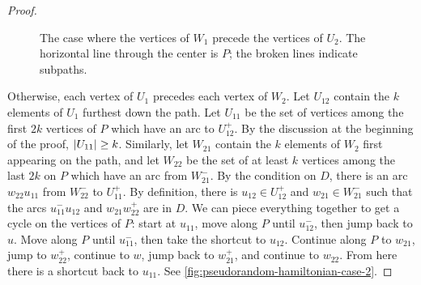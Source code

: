 \documentclass[11pt,english]{article}
\theoremstyle{plain}
\theoremstyle{definition}
\theoremstyle{definition}
\theoremstyle{plain}
\theoremstyle{plain}
\theoremstyle{plain}
\theoremstyle{plain}
\theoremstyle{remark}
\theoremstyle{remark}
\let\originalleft\left
\let\originalright\right
\renewcommand{\left}{\mathopen{}\mathclose\bgroup\originalleft}
\renewcommand{\right}{\aftergroup\egroup\originalright}
\begin{document}
\begin{proof}
\begin{figure}[H]
\begin{center}
\hspace{0.5cm}
\hspace{0.5cm}
\end{center}

\protect\caption{\label{fig:pseudorandom-hamiltonian-case-1}The case where the vertices
of $W_{1}$ precede the vertices of $U_{2}$. The horizontal line
through the center is $P$; the broken lines indicate subpaths.}
\end{figure}


Otherwise, each vertex of $U_{1}$ precedes each vertex of $W_{2}$.
Let $U_{12}$ contain the $k$ elements of $U_{1}$ furthest down
the path. Let $U_{11}$ be the set of vertices among the first $2k$
vertices of $P$ which have an arc to $U_{12}^{+}$. By the discussion
at the beginning of the proof, $\left|U_{11}\right|\ge k$. Similarly,
let $W_{21}$ contain the $k$ elements of $W_{2}$ first appearing
on the path, and let $W_{22}$ be the set of at least $k$ vertices
among the last $2k$ on $P$ which have an arc from $W_{21}^{-}$.
By the condition on $D$, there is an arc $w_{22}u_{11}$ from $W_{22}^{-}$
to $U_{11}^{+}$. By definition, there is $u_{12}\in U_{12}^{+}$
and $w_{21}\in W_{21}^{-}$ such that the arcs $u_{11}^{-}u_{12}$
and $w_{21}w_{22}^{+}$ are in $D$. We can piece everything together
to get a cycle on the vertices of $P$: start at $u_{11}$, move along
$P$ until $u_{12}^{-}$, then jump back to $u$. Move along $P$
until $u_{11}^{-}$, then take the shortcut to $u_{12}$. Continue
along $P$ to $w_{21}$, jump to $w_{22}^{+}$, continue to $w$,
jump back to $w_{21}^{+}$, and continue to $w_{22}$. From here there
is a shortcut back to $u_{11}$. See \ref{fig:pseudorandom-hamiltonian-case-2}.


\end{proof}
\end{document}
